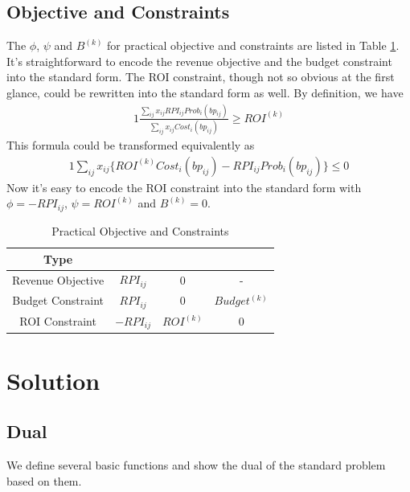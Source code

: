 \documentclass{article}
\newcommand{\sumij}{\sum\limits_{ij}}
\newcommand{\sx}{x_{ij}}
\newcommand{\sbp}{bp_{ij}}
\newcommand{\sumijx}[1]{\sumij\sx{}#1}
\newcommand{\sProb}{Prob_i(\sbp)}
\newcommand{\sCost}{Cost_i(\sbp)}
\newcommand{\sB}{B^{(k)}}
\newcommand{\sBudget}{Budget^{(k)}}
\newcommand{\sROI}{ROI^{(k)}}
\newcommand{\sCPI}{RPI_{ij}}
\newcommand{\sRevenuePforP}{\sumijx{\sCPI\sProb}}
\newcommand{\sBiddingCost}{\sumijx{\sCost}}
\newcommand{\pprob}{\phi}
\newcommand{\pcost}{\psi}
\begin{document}
\subsection{Objective and Constraints} \label{ObjectivesAndConstraints}


The $\pprob$, $\pcost$ and $\sB$ for practical objective and constraints are listed in Table \ref{TableObjectives}.
It's straightforward to encode the revenue objective and the budget constraint into the standard form.
The ROI constraint, though not so obvious at the first glance, could be rewritten into the standard form as well.
By definition, we have
\begin{alignat}{1}
\frac{\sRevenuePforP}{\sBiddingCost}\ge\sROI
\end{alignat}
This formula could be transformed equivalently as
\begin{alignat}{1}
\sumijx{\{\sROI\sCost-\sCPI\sProb\}}\le0
\end{alignat}
Now it's easy to encode the ROI constraint into the standard form with $\pprob=-\sCPI$, $\pcost=\sROI$ and $\sB=0$.

\begin{table}
\caption{Practical Objective and Constraints\label{TableObjectives}}
\begin{center}
\begin{tabular}{c|c|c|c}
\textbf{Type}      & \boldmath{$\pprob$} & \boldmath{$\pcost$}  & \boldmath{$\sB$} \\
\hline
\hline
Revenue Objective  & $\sCPI$             & $0$                  & - \\
Budget Constraint  & $\sCPI$             & $0$                  & $\sBudget$ \\
ROI Constraint     & $-\sCPI$            & $\sROI$              & $0$ \\
\end{tabular}
\end{center}
\end{table}

\section{Solution} \label{Solution}

\subsection{Dual}

We define several basic functions and show the dual of the standard problem based on them.
\end{document}
